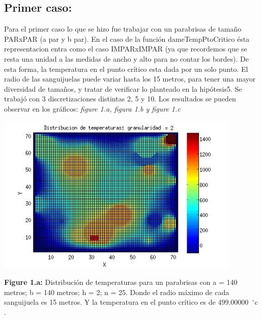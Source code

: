 \documentclass[a4paper]{article}
\begin{document}
\subsection{Primer caso:}

Para el primer caso lo que se hizo fue trabajar con un parabrisas de tamaño PARxPAR (a par y b par). En el caso de la función dameTempPtoCritico ésta representacion entra como el caso IMPARxIMPAR (ya que recordemos que se resta una unidad a las medidas de ancho y alto para no contar los bordes). De esta forma, la temperatura en el punto crítico esta dada por un solo punto.
El radio de las sanguijuelas puede variar hasta los 15 metros, para tener una mayor diversidad de tamaños, y tratar de verificar lo planteado en la hipótesis5.\newline
Se trabajó con 3 discretizaciones distintas 2, 5 y 10. Los resultados se pueden observar en los gráficos: \textit{figure 1.a, figura 1.b y figure 1.c}

\includegraphics[width=\textwidth,height=3.0in,keepaspectratio
]{140x140h2.jpg} \newline
\begin {flushleft}
\textbf{Figure 1.a:} Distribución de temperaturas para un parabrisas con a = 140 metros; b = 140 metros; h = 2; n = 25. Donde el radio máximo de cada sanguijuela es 15 metros. Y la temperatura en el punto crítico es de 499.00000\hspace{-1.5mm}$\phantom{a}^{\circ}$c .
\end{flushleft}
\end{document}
